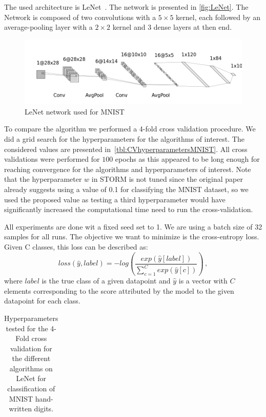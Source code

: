 \documentclass[a4paper,11pt,oneside]{report}
\begin{document}
The used architecture is LeNet~\cite{leNet}. The network is presented in \autoref{fig:LeNet}. The Network is composed of two convolutions with a $5 \times 5$ kernel, each followed by an average-pooling layer with a $2 \times 2$ kernel and 3 dense layers at then end. 


\begin{figure}
    \centering
    \includegraphics[width=\columnwidth]{midterm presentation/images/LeNet.png}
    \caption{LeNet network used for MNIST}
    \label{fig:LeNet}
\end{figure}

To compare the algorithm we performed a 4-fold cross validation procedure. We did a grid search for the hyperparameters for the algorithms of interest. The considered values are presented in~\autoref{tbl:CVhyperparametersMNIST}. All cross validations were performed for $100$ epochs as this appeared to be long enough for reaching convergence for the algorithms and hyperparameters of interest.  
Note that the hyperparameter $w$ in STORM is not tuned since the original paper already suggests using a value of 0.1 for classifying the MNIST dataset, so we used the proposed value as testing a third hyperparameter would have significantly increased the computational time need to run the cross-validation.


All experiments are done wit a fixed seed set to 1. We are using a batch size of 32 samples for all runs. The objective we want to minimize is the cross-entropy loss. Given C classes, this loss can be described as:
\begin{equation}\label{eq:CrossEntropyLoss}
    loss(\hat{y}, label) = -log\left(\frac{exp(\hat{y}[label])}{\sum_{c=1}^C exp(\hat{y}[c])}\right)\,,
\end{equation}
where $label$ is the true class of a given datapoint and $\hat{y}$ is a vector with $C$ elements corresponding to the score attributed by the model to the given datapoint for each class.

\begin{table}
    \begin{center}
        \begin{tabular}{||c | c | l||}
             \hline
             
        \end{tabular}
    \end{center}
    \caption{Hyperparameters tested for the 4-Fold cross validation for the different algorithms on LeNet for classification of MNIST hand-written digits.
    }
    \label{tbl:CVhyperparametersMNIST}
\end{table}
\end{document}
